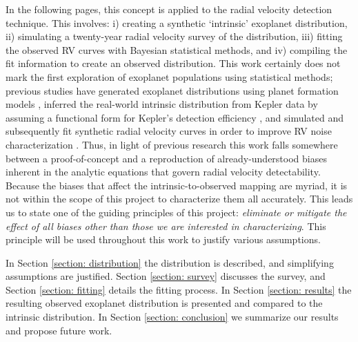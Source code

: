 \documentclass[12pt,manuscript]{aastex}
\begin{document}
In the following pages, this concept is applied to the radial velocity detection technique. 
This involves: i) creating a synthetic `intrinsic' exoplanet distribution, ii) simulating a twenty-year radial velocity survey of the distribution, iii) fitting the observed RV curves with Bayesian statistical methods, and iv) compiling the fit information to create an observed distribution. 
This work certainly does not mark the first exploration of exoplanet populations using statistical methods; previous studies have generated exoplanet distributions using planet formation models \citep{ronco}, inferred the real-world intrinsic distribution from Kepler data by assuming a functional form for Kepler's detection efficiency \citep{traub16}, and
simulated and subsequently fit synthetic radial velocity curves in order to improve RV noise characterization \citep{dumusque16}.
Thus, in light of previous research this work falls somewhere between a proof-of-concept and a reproduction of already-understood biases inherent in the analytic equations that govern radial velocity detectability.
Because the biases that affect the intrinsic-to-observed mapping are myriad, it is not within the scope of this project to characterize them all accurately. 
This leads us to state one of the guiding principles of this project:
\textit{eliminate or mitigate the effect of all biases other than those we are interested in characterizing}.
This principle will be used throughout this work to justify various assumptions.

In Section \ref{section: distribution} the  distribution is described, and simplifying assumptions are justified.
Section \ref{section: survey} discusses the survey, and
Section \ref{section: fitting} details the fitting process.
In Section \ref{section: results} the resulting observed exoplanet distribution is presented and compared to the intrinsic distribution.
In Section \ref{section: conclusion} we summarize our results  and propose future work.
\end{document}
